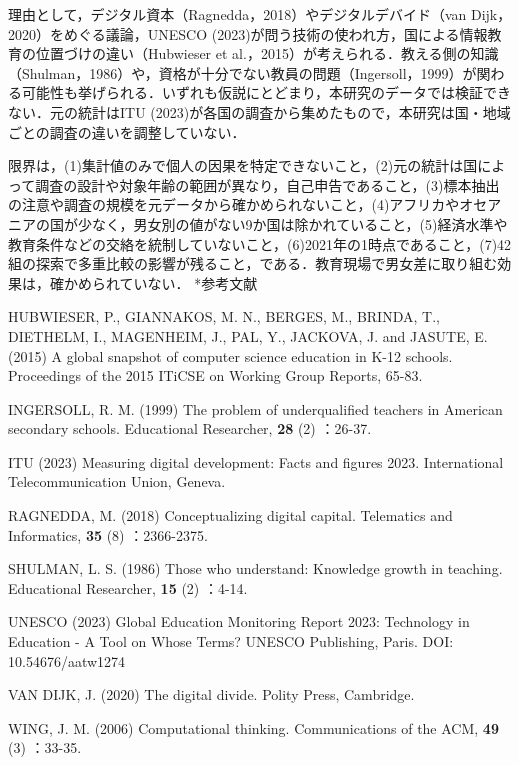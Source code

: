 \documentclass[a4paper,10pt,twocolumn]{ltjsarticle}
\makeatletter
\renewcommand{\section}{\@startsection{section}{1}{\z@}{1.1\Cvs \@plus.4\Cdp \@minus.2\Cdp}{.5\Cvs \@plus.2\Cdp}{\normalfont\gtfamily\bfseries\large}}
\makeatother
\begin{document}
理由として，デジタル資本（Ragnedda，2018）やデジタルデバイド（van Dijk，2020）をめぐる議論，UNESCO (2023)が問う技術の使われ方，国による情報教育の位置づけの違い（Hubwieser et al.，2015）が考えられる．教える側の知識（Shulman，1986）や，資格が十分でない教員の問題（Ingersoll，1999）が関わる可能性も挙げられる．いずれも仮説にとどまり，本研究のデータでは検証できない．元の統計はITU (2023)が各国の調査から集めたもので，本研究は国・地域ごとの調査の違いを調整していない．

限界は，(1)集計値のみで個人の因果を特定できないこと，(2)元の統計は国によって調査の設計や対象年齢の範囲が異なり，自己申告であること，(3)標本抽出の注意や調査の規模を元データから確かめられないこと，(4)アフリカやオセアニアの国が少なく，男女別の値がない9か国は除かれていること，(5)経済水準や教育条件などの交絡を統制していないこと，(6)2021年の1時点であること，(7)42組の探索で多重比較の影響が残ること，である．教育現場で男女差に取り組む効果は，確かめられていない．
\section*{参考文献}
\begingroup\scriptsize\raggedright{} 
\begin{list}{}{\setlength{\leftmargin}{1.5\zw}\setlength{\itemindent}{-1.5\zw}\setlength{\labelwidth}{0pt}\setlength{\labelsep}{0pt}\setlength{\itemsep}{1pt}\setlength{\parsep}{0pt}\setlength{\topsep}{0pt}\setlength{\listparindent}{0pt}}
\item HUBWIESER, P., GIANNAKOS, M. N., BERGES, M., BRINDA, T., DIETHELM, I., MAGENHEIM, J., PAL, Y., JACKOVA, J. and JASUTE, E. (2015) A global snapshot of computer science education in K-12 schools. Proceedings of the 2015 ITiCSE on Working Group Reports, 65-83.
\item INGERSOLL, R. M. (1999) The problem of underqualified teachers in American secondary schools. Educational Researcher, \textbf{28} (2) ：26-37.
\item ITU (2023) Measuring digital development: Facts and figures 2023. International Telecommunication Union, Geneva.
\item RAGNEDDA, M. (2018) Conceptualizing digital capital. Telematics and Informatics, \textbf{35} (8) ：2366-2375.
\item SHULMAN, L. S. (1986) Those who understand: Knowledge growth in teaching. Educational Researcher, \textbf{15} (2) ：4-14.
\item UNESCO (2023) Global Education Monitoring Report 2023: Technology in Education - A Tool on Whose Terms? UNESCO Publishing, Paris. DOI: 10.54676/aatw1274
\item VAN DIJK, J. (2020) The digital divide. Polity Press, Cambridge.
\item WING, J. M. (2006) Computational thinking. Communications of the ACM, \textbf{49} (3) ：33-35.
\end{list}\endgroup
\end{document}
